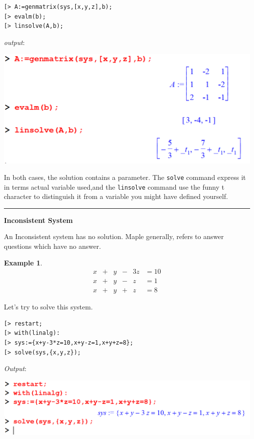 \documentclass[
]{book}
\theoremstyle{definition}
\theoremstyle{definition}
\newtheorem{example}{Example}[chapter]
\theoremstyle{definition}
\theoremstyle{definition}
\theoremstyle{remark}
\begin{document}
\begin{verbatim}
[> A:=genmatrix(sys,[x,y,z],b);
[> evalm(b);
[> linsolve(A,b);
\end{verbatim}

\emph{output}:

\includegraphics{figures/Lesson 5/fig10.png}

In both cases, the solution contains a parameter.
The \texttt{solve} command express it in terms actual variable used,and the \texttt{linsolve} command use the funny t character to distinguish it from a variable you might have defined yourself.

\begin{center}\rule{0.5\linewidth}{0.5pt}\end{center}

\textbf{Inconsistent System}

An Inconsistent system has no solution. Maple generally, refers to answer questions which have no answer.

\begin{example}
\protect\hypertarget{exm:unnamed-chunk-46}{}\label{exm:unnamed-chunk-46}\[
\begin{array}{ccccccccc}
x &+& y &-& 3z &= 10\\
x &+& y &-&  z &= 1\\
x &+& y &+&  z &= 8  
\end{array}
\]
\end{example}

Let's try to solve this system.

\begin{verbatim}
[> restart;
[> with(linalg):
[> sys:={x+y-3*z=10,x+y-z=1,x+y+z=8};
[> solve(sys,{x,y,z});
\end{verbatim}

\emph{Output}:

\includegraphics{figures/Lesson 5/fig11.png}
\end{document}
